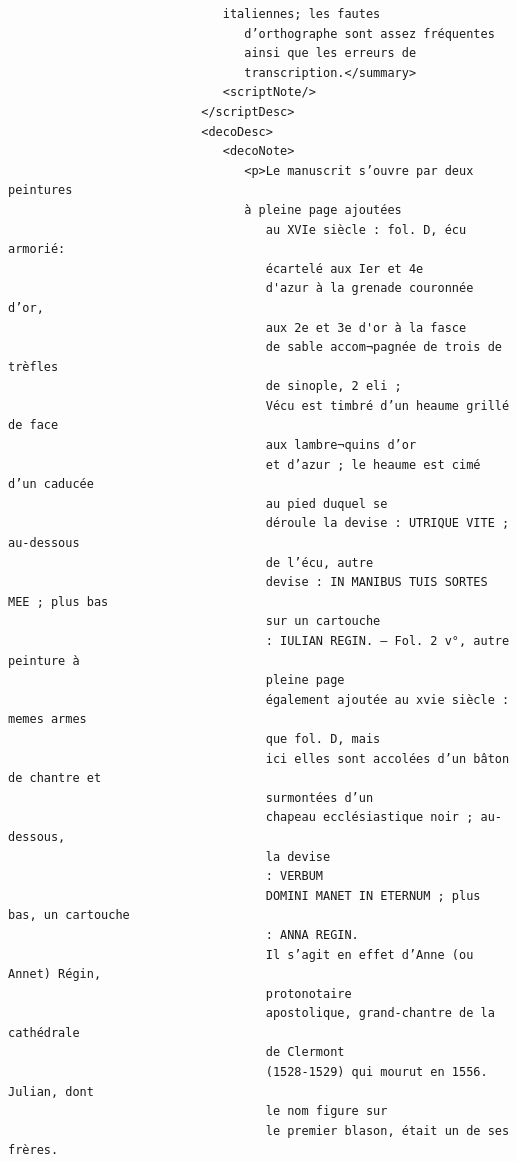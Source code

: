 \documentclass[a4paper,12pt,twoside]{book}
\begin{document}
\begin{verbatim}
                              italiennes; les fautes
                                 d’orthographe sont assez fréquentes 
                                 ainsi que les erreurs de
                                 transcription.</summary>
                              <scriptNote/>
                           </scriptDesc>
                           <decoDesc>
                              <decoNote>
                                 <p>Le manuscrit s’ouvre par deux peintures
                                 à pleine page ajoutées
                                    au XVIe siècle : fol. D, écu armorié: 
                                    écartelé aux Ier et 4e
                                    d'azur à la grenade couronnée d’or, 
                                    aux 2e et 3e d'or à la fasce
                                    de sable accom¬pagnée de trois de trèfles
                                    de sinople, 2 eli ;
                                    Vécu est timbré d’un heaume grillé de face
                                    aux lambre¬quins d’or
                                    et d’azur ; le heaume est cimé d’un caducée
                                    au pied duquel se
                                    déroule la devise : UTRIQUE VITE ; au-dessous
                                    de l’écu, autre
                                    devise : IN MANIBUS TUIS SORTES MEE ; plus bas
                                    sur un cartouche
                                    : IULIAN REGIN. — Fol. 2 v°, autre peinture à
                                    pleine page
                                    également ajoutée au xvie siècle : memes armes 
                                    que fol. D, mais
                                    ici elles sont accolées d’un bâton de chantre et
                                    surmontées d’un
                                    chapeau ecclésiastique noir ; au-dessous, 
                                    la devise
                                    : VERBUM
                                    DOMINI MANET IN ETERNUM ; plus bas, un cartouche
                                    : ANNA REGIN.
                                    Il s’agit en effet d’Anne (ou Annet) Régin,
                                    protonotaire
                                    apostolique, grand-chantre de la cathédrale
                                    de Clermont
                                    (1528-1529) qui mourut en 1556. Julian, dont
                                    le nom figure sur
                                    le premier blason, était un de ses frères.

\end{verbatim}
\end{document}
